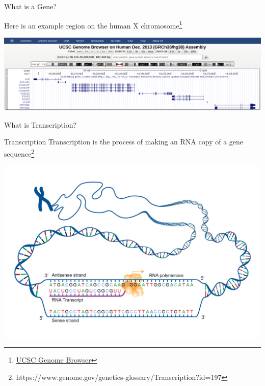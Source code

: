 \documentclass[aspectratio=169,11pt]{beamer}
\begin{document}
\begin{frame}{What is a Gene?}

	Here is an example region on the human X chromosome\footnote{\href{https://genome.ucsc.edu/cgi-bin/hgTracks?db=hg38\&lastVirtModeType=default\&lastVirtModeExtraState=\&virtModeType=default\&virtMode=0\&nonVirtPosition=\&position=chrX\%3A49186416\%2D49289908\&hgsid=804874837\_yhlSH5Dok8PNRGEWxk6lc7auhaeK}{UCSC Genome Browser}}

	\begin{center}
	\includegraphics[scale=0.14]{figures/ucscExample.png} 	
	\end{center}

\end{frame}

\begin{frame}{What is Transcription?}

	\begin{block}{Transcription}
		Transcription is the process of making an RNA copy of a gene sequence\footnote{https://www.genome.gov/genetics-glossary/Transcription?id=197}
	\end{block}

	\begin{center}
	\includegraphics[scale=0.14]{figures/transcription.jpg} 
	\end{center}

\end{frame}
\end{document}
